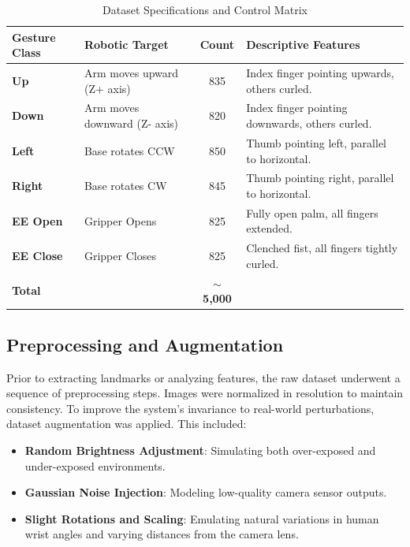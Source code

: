 \documentclass[conference]{IEEEtran}
\begin{document}
\begin{table}[H]
    \centering
    \caption{Dataset Specifications and Control Matrix}
    \label{tab:dataset_spec}
    \begin{tabularx}{\linewidth}{>{\raggedright\arraybackslash}p{2cm} >{\raggedright\arraybackslash}p{2.5cm} c X}
        \toprule
        \textbf{Gesture Class} & \textbf{Robotic Target} & \textbf{Count} & \textbf{Descriptive Features} \\ \midrule
        \textbf{Up} & Arm moves upward (Z+ axis) & 835 & Index finger pointing upwards, others curled. \\
        \textbf{Down} & Arm moves downward (Z- axis) & 820 & Index finger pointing downwards, others curled. \\
        \textbf{Left} & Base rotates CCW & 850 & Thumb pointing left, parallel to horizontal. \\
        \textbf{Right} & Base rotates CW & 845 & Thumb pointing right, parallel to horizontal. \\
        \textbf{EE Open} & Gripper Opens & 825 & Fully open palm, all fingers extended. \\
        \textbf{EE Close} & Gripper Closes & 825 & Clenched fist, all fingers tightly curled. \\ \midrule
        \textbf{Total} & & \textbf{$\sim$5,000} & \\ \bottomrule
    \end{tabularx}
\end{table}

\subsection{Preprocessing and Augmentation}
Prior to extracting landmarks or analyzing features, the raw dataset underwent a sequence of preprocessing steps. Images were normalized in resolution to maintain consistency. To improve the system's invariance to real-world perturbations, dataset augmentation was applied. This included:
\begin{itemize}
    \item \textbf{Random Brightness Adjustment}: Simulating both over-exposed and under-exposed environments.
    \item \textbf{Gaussian Noise Injection}: Modeling low-quality camera sensor outputs.
    \item \textbf{Slight Rotations and Scaling}: Emulating natural variations in human wrist angles and varying distances from the camera lens.
\end{itemize}
\end{document}
